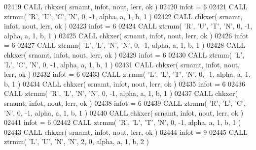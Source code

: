 \begin{DoxyCode}
02419       \textcolor{keyword}{CALL }chkxer( srnamt, infot, nout, lerr, ok )
02420       infot = 6
02421       \textcolor{keyword}{CALL }ztrmm( \textcolor{stringliteral}{'R'}, \textcolor{stringliteral}{'U'}, \textcolor{stringliteral}{'C'}, \textcolor{stringliteral}{'N'}, 0, -1, alpha, a, 1, b, 1 )
02422       \textcolor{keyword}{CALL }chkxer( srnamt, infot, nout, lerr, ok )
02423       infot = 6
02424       \textcolor{keyword}{CALL }ztrmm( \textcolor{stringliteral}{'R'}, \textcolor{stringliteral}{'U'}, \textcolor{stringliteral}{'T'}, \textcolor{stringliteral}{'N'}, 0, -1, alpha, a, 1, b, 1 )
02425       \textcolor{keyword}{CALL }chkxer( srnamt, infot, nout, lerr, ok )
02426       infot = 6
02427       \textcolor{keyword}{CALL }ztrmm( \textcolor{stringliteral}{'L'}, \textcolor{stringliteral}{'L'}, \textcolor{stringliteral}{'N'}, \textcolor{stringliteral}{'N'}, 0, -1, alpha, a, 1, b, 1 )
02428       \textcolor{keyword}{CALL }chkxer( srnamt, infot, nout, lerr, ok )
02429       infot = 6
02430       \textcolor{keyword}{CALL }ztrmm( \textcolor{stringliteral}{'L'}, \textcolor{stringliteral}{'L'}, \textcolor{stringliteral}{'C'}, \textcolor{stringliteral}{'N'}, 0, -1, alpha, a, 1, b, 1 )
02431       \textcolor{keyword}{CALL }chkxer( srnamt, infot, nout, lerr, ok )
02432       infot = 6
02433       \textcolor{keyword}{CALL }ztrmm( \textcolor{stringliteral}{'L'}, \textcolor{stringliteral}{'L'}, \textcolor{stringliteral}{'T'}, \textcolor{stringliteral}{'N'}, 0, -1, alpha, a, 1, b, 1 )
02434       \textcolor{keyword}{CALL }chkxer( srnamt, infot, nout, lerr, ok )
02435       infot = 6
02436       \textcolor{keyword}{CALL }ztrmm( \textcolor{stringliteral}{'R'}, \textcolor{stringliteral}{'L'}, \textcolor{stringliteral}{'N'}, \textcolor{stringliteral}{'N'}, 0, -1, alpha, a, 1, b, 1 )
02437       \textcolor{keyword}{CALL }chkxer( srnamt, infot, nout, lerr, ok )
02438       infot = 6
02439       \textcolor{keyword}{CALL }ztrmm( \textcolor{stringliteral}{'R'}, \textcolor{stringliteral}{'L'}, \textcolor{stringliteral}{'C'}, \textcolor{stringliteral}{'N'}, 0, -1, alpha, a, 1, b, 1 )
02440       \textcolor{keyword}{CALL }chkxer( srnamt, infot, nout, lerr, ok )
02441       infot = 6
02442       \textcolor{keyword}{CALL }ztrmm( \textcolor{stringliteral}{'R'}, \textcolor{stringliteral}{'L'}, \textcolor{stringliteral}{'T'}, \textcolor{stringliteral}{'N'}, 0, -1, alpha, a, 1, b, 1 )
02443       \textcolor{keyword}{CALL }chkxer( srnamt, infot, nout, lerr, ok )
02444       infot = 9
02445       \textcolor{keyword}{CALL }ztrmm( \textcolor{stringliteral}{'L'}, \textcolor{stringliteral}{'U'}, \textcolor{stringliteral}{'N'}, \textcolor{stringliteral}{'N'}, 2, 0, alpha, a, 1, b, 2 )

\end{DoxyCode}
